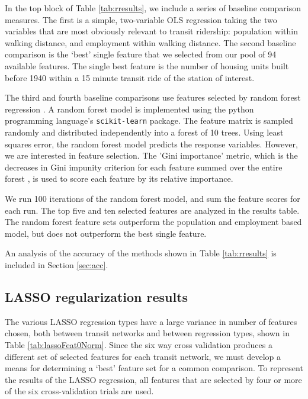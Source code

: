 \documentclass[11pt]{article}
\begin{document}
In the top block of Table \ref{tab:rresults}, we include a series of baseline comparison measures. The first is a simple, two-variable OLS regression taking the two variables that are most obviously relevant to transit ridership: population within walking distance, and employment within walking distance. The second baseline comparison is the `best' single feature that we selected from our pool of 94 available features. The single best feature is the number of housing units built before 1940 within a 15 minute transit ride of the station of interest. 

The third and fourth baseline comparisons use features selected by random forest regression \cite{Breiman2001}. A random forest model is implemented using the python programming language's \texttt{scikit-learn} package. The feature matrix is sampled randomly and distributed independently into a forest of 10 trees. Using least squares error, the random forest model predicts the response variables. However, we are interested in feature selection. The 'Gini importance' metric, which is the decreases in Gini impunity criterion for each feature summed over the entire forest \cite{Breiman1984}, is used to score each feature by its relative importance.  

We run 100 iterations of the random forest model, and sum the feature scores for each run. The top five and ten selected features are analyzed in the results table. The random forest feature sets outperform the population and employment based model, but does not outperform the best single feature. 


An analysis of the accuracy of the methods shown in Table \ref{tab:rresults} is included in Section \ref{sec:acc}.

\subsection{LASSO regularization results}

The various LASSO regression types have a large variance in number of features chosen, both between transit networks and between regression types, shown in Table \ref{tab:lassoFeat0Norm}. Since the six way cross validation produces a different set of selected features for each transit network, we must develop a means for determining a `best' feature set for a common comparison. To represent the results of the LASSO regression, all features that are selected by four or more of the six cross-validation trials are used. 
\end{document}

